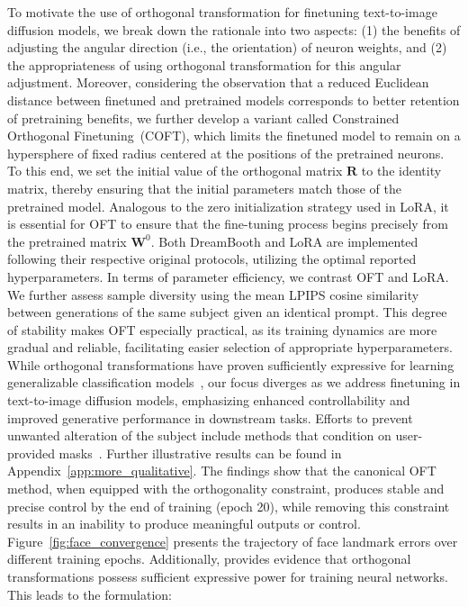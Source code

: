 \begin{itemize}[leftmargin=*,nosep]
To motivate the use of orthogonal transformation for finetuning text-to-image diffusion models, we break down the rationale into two aspects: (1) the benefits of adjusting the angular direction (i.e., the orientation) of neuron weights, and (2) the appropriateness of using orthogonal transformation for this angular adjustment. Moreover, considering the observation that a reduced Euclidean distance between finetuned and pretrained models corresponds to better retention of pretraining benefits, we further develop a variant called Constrained Orthogonal Finetuning~(COFT), which limits the finetuned model to remain on a hypersphere of fixed radius centered at the positions of the pretrained neurons. To this end, we set the initial value of the orthogonal matrix $\bm{R}$ to the identity matrix, thereby ensuring that the initial parameters match those of the pretrained model. Analogous to the zero initialization strategy used in LoRA, it is essential for OFT to ensure that the fine-tuning process begins precisely from the pretrained matrix $\bm{W}^0$. Both DreamBooth and LoRA are implemented following their respective original protocols, utilizing the optimal reported hyperparameters. In terms of parameter efficiency, we contrast OFT and LoRA. We further assess sample diversity using the mean LPIPS cosine similarity between generations of the same subject given an identical prompt. This degree of stability makes OFT especially practical, as its training dynamics are more gradual and reliable, facilitating easier selection of appropriate hyperparameters. While orthogonal transformations have proven sufficiently expressive for learning generalizable classification models~\cite{liu2021orthogonal}, our focus diverges as we address finetuning in text-to-image diffusion models, emphasizing enhanced controllability and improved generative performance in downstream tasks. Efforts to prevent unwanted alteration of the subject include methods that condition on user-provided masks~\cite{avrahami2022blended,nichol2022glide}. Further illustrative results can be found in Appendix~\ref{app:more_qualitative}. The findings show that the canonical OFT method, when equipped with the orthogonality constraint, produces stable and precise control by the end of training (epoch 20), while removing this constraint results in an inability to produce meaningful outputs or control. Figure~\ref{fig:face_convergence} presents the trajectory of face landmark errors over different training epochs. Additionally, \cite{liu2021orthogonal} provides evidence that orthogonal transformations possess sufficient expressive power for training neural networks. This leads to the formulation:


\end{itemize}
